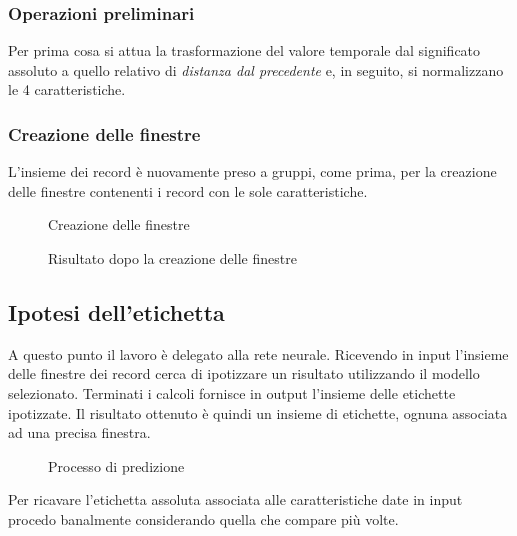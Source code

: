 \subsubsection{Operazioni preliminari}
Per prima cosa si attua la trasformazione del valore temporale dal significato assoluto a quello relativo di 
\textit{distanza dal precedente}
e, in seguito, si normalizzano le 4 caratteristiche.


\subsubsection{Creazione delle finestre}
L'insieme dei record è nuovamente preso a gruppi, come prima, per la creazione delle finestre contenenti i 
record con le sole caratteristiche.

\vfill
\begin{figure}[H]
    \centering
    
    \caption{Creazione delle finestre}
    \label{fig:create_segments}
\end{figure}

\begin{figure}[H]
    \centering
    
    \caption{Risultato dopo la creazione delle finestre}
    \label{fig:segments}
\end{figure}



\subsection{Ipotesi dell'etichetta}
A questo punto il lavoro è delegato alla rete neurale.
Ricevendo in input l'insieme delle finestre dei record cerca di ipotizzare un risultato utilizzando 
il modello selezionato. Terminati i calcoli fornisce in output l'insieme delle etichette ipotizzate.
Il risultato ottenuto è quindi un insieme di etichette, ognuna associata ad una precisa finestra. 

\begin{figure}[H]
    \centering
    
    \caption{Processo di predizione}
    \label{fig:prediction}
\end{figure}

\noindent Per ricavare l'etichetta assoluta associata alle caratteristiche date in input procedo banalmente 
considerando quella che compare più volte.